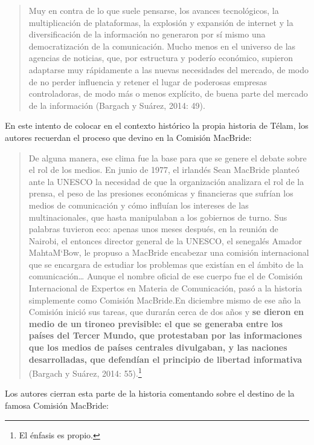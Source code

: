 \begin{quote}
Muy en contra de lo que suele pensarse, los avances tecnológicos, la multiplicación de plataformas, la explosión y expansión de internet y la diversificación de la información no generaron por sí mismo una democratización de la comunicación. Mucho menos en el universo de las agencias de noticias, que, por estructura y poderío económico, supieron adaptarse muy rápidamente a las nuevas necesidades del mercado, de modo de no perder influencia y retener el lugar de poderosas empresas controladoras, de modo más o menos explícito, de buena parte del mercado de la información (Bargach y Suárez, 2014: 49).
\end{quote}

En este intento de colocar en el contexto histórico la propia historia de Télam, los autores recuerdan el proceso que devino en la Comisión MacBride:

\begin{quote}
De alguna manera, ese clima fue la base para que se genere el debate sobre el rol de los medios. En junio de 1977, el irlandés Sean MacBride planteó ante la UNESCO la necesidad de que la organización analizara el rol de la prensa, el peso de las presiones económicas y financieras que sufrían los medios de comunicación y cómo influían los intereses de las multinacionales, que hasta manipulaban a los gobiernos de turno. Sus palabras tuvieron eco: apenas unos meses después, en la reunión de Nairobi, el entonces director general de la UNESCO, el senegalés Amador MahtaM`Bow, le propuso a MacBride encabezar una comisión internacional que se encargara de estudiar los problemas que existían en el ámbito de la comunicación\ldots{} Aunque el nombre oficial de ese cuerpo fue el de Comisión Internacional de Expertos en Materia de Comunicación, pasó a la historia simplemente como Comisión MacBride.En diciembre mismo de ese año la Comisión inició sus tareas, que durarán cerca de dos años y \textbf{se dieron en medio de un tironeo previsible: el que se generaba entre los países del Tercer Mundo, que protestaban por las informaciones que los medios de países centrales divulgaban, y las naciones desarrolladas, que defendían el principio de libertad informativa} (Bargach y Suárez, 2014: 55).\footnote{El énfasis es propio.}
\end{quote}

Los autores cierran esta parte de la historia comentando sobre el destino de la famosa Comisión MacBride:

